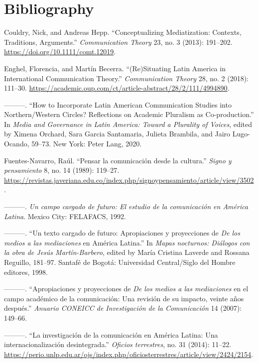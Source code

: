 \documentclass{tufte-handout}
\begin{document}
\section{Bibliography}\label{bibliography}

\begin{hangparas}{.25in}{1} 



Couldry, Nick, and Andreas Hepp. ``Conceptualizing Mediatization:
Contexts, Traditions, Arguments.'' \emph{Communication Theory} 23, no. 3
(2013): 191--202. \url{https://doi.org/10.1111/comt.12019}.

Enghel, Florencia, and Martín Becerra. ``(Re)Situating Latin America in
International Communication Theory.'' \emph{Communication Theory} 28,
no. 2 (2018): 111--30.
\url{https://academic.oup.com/ct/article-abstract/28/2/111/4994890}.

---------. ``How to Incorporate Latin American Communication Studies
into Northern/Western Circles? Reflections on Academic Pluralism as
Co-production.'' In \emph{Media and Governance in Latin America: Toward
a Plurality of Voices}, edited by Ximena Orchard, Sara Garcia
Santamaria, Julieta Brambila, and Jairo Lugo-Ocando, 59--73. New York:
Peter Lang, 2020.

Fuentes-Navarro, Raúl. ``Pensar la comunicación desde la cultura.''
\emph{Signo y pensamiento} 8, no. 14 (1989): 119--27.
\url{https://revistas.javeriana.edu.co/index.php/signoypensamiento/article/view/3502}.

---------. \emph{Un campo cargado de futuro: El estudio de la
comunicación en América Latina}. Mexico City: FELAFACS, 1992.

---------. ``Un texto cargado de futuro: Apropiaciones y proyecciones de
\emph{De los medios a las mediaciones} en América Latina.'' In
\emph{Mapas nocturnos: Diálogos con la obra de Jesús Martín-Barbero},
edited by María Cristina Laverde and Rossana Reguillo, 181--97. Santafé
de Bogotá: Universidad Central/Siglo del Hombre editores, 1998.

---------. ``Apropiaciones y proyecciones de \emph{De los medios a las
mediaciones} en el campo académico de la comunicación: Una revisión de
su impacto, veinte años después.'' \emph{Anuario CONEICC de
Investigación de la Comunicación} 14 (2007): 149--66.

---------. ``La investigación de la comunicación en América Latina: Una
internacionalización desintegrada.'' \emph{Oficios terrestres}, no. 31
(2014): 11--22.
\url{https://perio.unlp.edu.ar/ojs/index.php/oficiosterrestres/article/view/2424/2154}.


\end{hangparas}
\end{document}
